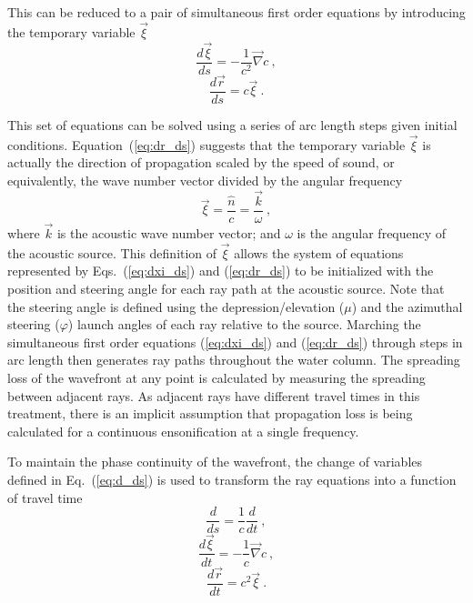 \documentclass{ws-jca}
\begin{document}
This can be reduced to a pair of simultaneous first order equations by
introducing the temporary variable \(\vec{\xi}\)
\begin{equation}
	\frac{d\vec{\xi}}{ds} = -\frac{1}{c^2} \vec{\nabla}c \:,
	\label{eq:dxi_ds}
\end{equation}
\begin{equation}
	\frac{d\vec{r}}{ds} = c \vec{\xi} \:.
	\label{eq:dr_ds}
\end{equation}

This set of equations can be solved using a series of arc length steps
given initial conditions.\cite{Yakowitz1986,Press1992}
Equation~(\ref{eq:dr_ds}) suggests that the temporary variable
\(\vec{\xi}\) is actually the direction of propagation scaled by the speed
of sound, or equivalently, the wave number vector divided by the angular
frequency
\begin{equation}
	\vec{\xi} = \frac{\hat{n}}{c} = \frac{\vec{k}}{\omega} \:,
	\label{eq:n_c}
\end{equation}
where 
\(\vec{k}\) is the acoustic wave number vector; and
\(\omega\) is the angular frequency of the acoustic source.
This definition of \(\vec{\xi}\) allows the system of equations represented
by Eqs.~(\ref{eq:dxi_ds}) and (\ref{eq:dr_ds}) to be initialized with the
position and steering angle for each ray path at the acoustic source.
Note that the steering angle is defined using the depression/elevation (\(\mu\)) and the azimuthal steering (\(\varphi\)) launch angles of each ray relative to the source.  
Marching the simultaneous first order equations (\ref{eq:dxi_ds}) and (\ref{eq:dr_ds}) through steps in arc length then
generates ray paths throughout the water column. The spreading loss of the
wavefront at any point is calculated by measuring the spreading between
adjacent rays. As adjacent rays have different travel times in this
treatment, there is an implicit assumption that propagation loss is being
calculated for a continuous ensonification at a single frequency.

To maintain the phase continuity of the wavefront, the change of
variables defined in Eq.~(\ref{eq:d_ds}) is used to transform the ray
equations into a function of travel time
\begin{equation}
	\frac{d}{ds} = \frac{1}{c} \frac{d}{dt} \:, 
	\label{eq:d_ds}
\end{equation}
\begin{equation}
	\frac{d\vec{\xi}}{dt} = -\frac{1}{c} \vec{\nabla}c \:,
	\label{eq:dxivec_dt}
\end{equation}
\begin{equation}
	\frac{d\vec{r}}{dt} = c^2 \vec{\xi} \:.
	\label{eq:drvec_dt}
\end{equation}
\end{document}
